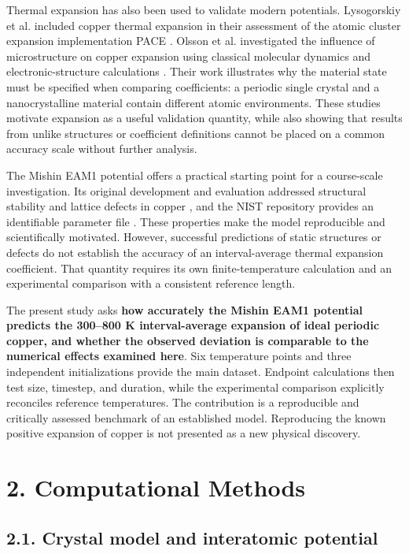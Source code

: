 \documentclass[10pt,a4paper,twocolumn]{article}
\begin{document}
Thermal expansion has also been used to validate modern potentials. Lysogorskiy et al. included copper thermal expansion in their assessment of the atomic cluster expansion implementation PACE \cite{r3}. Olsson et al. investigated the influence of microstructure on copper expansion using classical molecular dynamics and electronic-structure calculations \cite{r4}. Their work illustrates why the material state must be specified when comparing coefficients: a periodic single crystal and a nanocrystalline material contain different atomic environments. These studies motivate expansion as a useful validation quantity, while also showing that results from unlike structures or coefficient definitions cannot be placed on a common accuracy scale without further analysis.


The Mishin EAM1 potential offers a practical starting point for a course-scale investigation. Its original development and evaluation addressed structural stability and lattice defects in copper \cite{r5}, and the NIST repository provides an identifiable parameter file \cite{r6}. These properties make the model reproducible and scientifically motivated. However, successful predictions of static structures or defects do not establish the accuracy of an interval-average thermal expansion coefficient. That quantity requires its own finite-temperature calculation and an experimental comparison with a consistent reference length.


The present study asks \textbf{how accurately the Mishin EAM1 potential predicts the 300–800 K interval-average expansion of ideal periodic copper, and whether the observed deviation is comparable to the numerical effects examined here}. Six temperature points and three independent initializations provide the main dataset. Endpoint calculations then test size, timestep, and duration, while the experimental comparison explicitly reconciles reference temperatures. The contribution is a reproducible and critically assessed benchmark of an established model. Reproducing the known positive expansion of copper is not presented as a new physical discovery.


\section*{2. Computational Methods}

\subsection*{2.1. Crystal model and interatomic potential}
\end{document}
